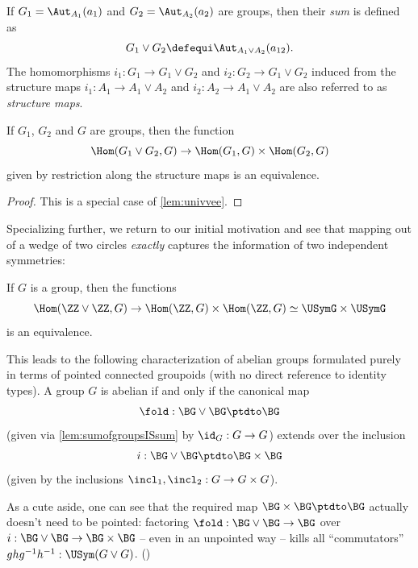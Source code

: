 \begin{definition}
  \label{def:sumofgroup}
  If $G_1=\Aut_{A_1}(a_1)$ and $G_2=\Aut_{A_2}(a_2)$ are groups, then their \emph{sum} is defined as
  $$G_1\vee G_2\defequi \Aut_{A_1\vee A_2}(a_{12}).$$
  The homomorphisms $i_1:G_1\to G_1\vee G_2$ and $i_2:G_2\to G_1\vee G_2$ induced from the structure maps  $i_1:A_1\to A_1\vee A_2$ and  $i_2:A_2\to A_1\vee A_2$ are also referred to as \emph{structure maps}.
\end{definition}
\begin{lemma}
  \label{lem:sumofgroupsISsum} If $G_1$, $G_2$ and $G$ are groups, then the function
  $$\Hom(G_1\vee G_2,G)\to\Hom(G_1,G)\times\Hom(G_2,G)$$
given by restriction along the structure maps is an equivalence.
\end{lemma}
\begin{proof}
  This is a special case of \cref{lem:univvee}.
\end{proof}
Specializing further, we return to our initial motivation and see that mapping out of a wedge of two circles \emph{exactly} captures the information of two independent symmetries:
\begin{corollary}
  \label{cor:ZplusZuniv}
  If $G$ is a group, then the functions
  $$\Hom(\ZZ\vee\ZZ,G)\to \Hom(\ZZ,G)\times\Hom(\ZZ,G)\simeq \USymG\times \USymG$$
  is an equivalence.
\end{corollary}

\begin{xca}\label{xca:whatAREabeliangroups}
  This leads to the following characterization of abelian groups
  formulated purely in terms of pointed connected groupoids
  (with no direct reference to identity types).
  A group $G$ is abelian if and only if the canonical map
  \[
    \fold :\BG\vee \BG\ptdto \BG
  \]
  (given via \cref{lem:sumofgroupsISsum} by $\id_G:G\to G$)
  extends over the inclusion
  \[
    i:\BG\vee \BG\ptdto \BG\times \BG
  \]
  (given by the inclusions $\incl_1,\incl_2:G\to G\times G$).

  As a cute aside, one can see that the required map $\BG\times\BG\ptdto\BG$
  actually doesn't need to be pointed:
  factoring
  $\fold:\BG\vee\BG\to\BG$ over $i:\BG\vee\BG\to\BG\times\BG$
  -- even in an unpointed way -- kills all ``commutators''
  $ghg^{-1}h^{-1}:\USym(G\vee G)$.
  ()
\end{xca}


